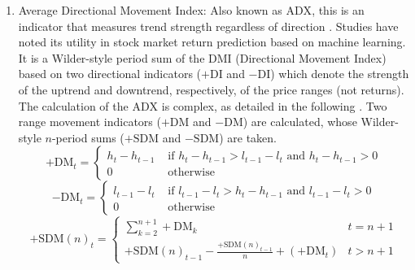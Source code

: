 \documentclass[stu,floatsintext]{apa7}
\begin{document}
\begin{enumerate}
\begin{equation}\text{TR}_t=\text{max}(|h_t-l_t|,|h_t-p_{t-1}|,|l_t-p_{t-1}|)\end{equation}
\begin{equation}\text{ATR}(n)_t=\begin{cases}
\displaystyle\sum_{k=2}^{n+1}\text{TR}_k &t=n+1\\
\displaystyle\frac{(n-1)\text{TR}_{t-1}+\text{TR}_t}{n} &t>n+1
\end{cases}\end{equation}
Both the True Range and the Average True Range can be used as features for stock prediction simultaneously \parencite{abolmakarem2024multistage}.
\item Average Directional Movement Index: Also known as $\text{ADX}$, this is an indicator that measures trend strength regardless of direction \parencite{wilder1978new}. Studies have noted its utility in stock market return prediction based on machine learning. It is a Wilder-style period sum of the $\text{DMI}$ (Directional Movement Index) based on two directional indicators ($+\text{DI}$ and $-\text{DI}$) which denote the strength of the uptrend and downtrend, respectively, of the price ranges (not returns). The calculation of the $\text{ADX}$ is complex, as detailed in the following \parencite{gurrib2018performance}. Two range movement indicators ($+\text{DM}$ and $-\text{DM}$) are calculated, whose Wilder-style $n$-period sums ($+\text{SDM}$ and $-\text{SDM}$) are taken.
\begin{equation}+\text{DM}_t=\begin{cases}
  h_t-h_{t-1}&\text{ if }h_t-h_{t-1}>l_{t-1}-l_t\text{ and }h_t-h_{t-1}>0\\
  0&\text{ otherwise}
\end{cases}\end{equation}
\begin{equation}-\text{DM}_t=\begin{cases}l_{t-1}-l_t&\text{ if }l_{t-1}-l_t>h_t-h_{t-1}\text{ and }l_{t-1}-l_t>0\\
0&\text{ otherwise}\end{cases}\end{equation}
\begin{equation}+\text{SDM}(n)_t=\begin{cases}\displaystyle\sum_{k=2}^{n+1}+\text{DM}_k& t=n+1\\
+\text{SDM}(n)_{t-1}-\displaystyle\frac{+\text{SDM}(n)_{t-1}}{n}+(+\text{DM}_t)& t>n+1\end{cases}\end{equation}

\end{enumerate}
\end{document}
